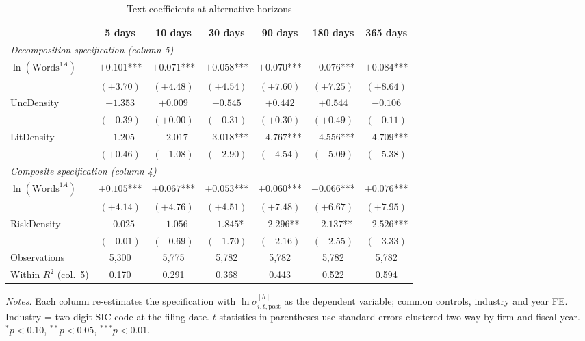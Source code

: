 \begin{table}[htbp]
\centering
\caption{Text coefficients at alternative horizons}
\label{tab:horizons}
\small
\begin{tabular}{lcccccc}
\toprule
 & 5 days & 10 days & 30 days & 90 days & 180 days & 365 days \\
\midrule
\multicolumn{7}{l}{\emph{Decomposition specification (column 5)}} \\
$\ln(\text{Words}^{1A})$ & $+0.101$*** & $+0.071$*** & $+0.058$*** & $+0.070$*** & $+0.076$*** & $+0.084$*** \\
 & $(+3.70)$ & $(+4.48)$ & $(+4.54)$ & $(+7.60)$ & $(+7.25)$ & $(+8.64)$ \\[2pt]
UncDensity & $-1.353$ & $+0.009$ & $-0.545$ & $+0.442$ & $+0.544$ & $-0.106$ \\
 & $(-0.39)$ & $(+0.00)$ & $(-0.31)$ & $(+0.30)$ & $(+0.49)$ & $(-0.11)$ \\[2pt]
LitDensity & $+1.205$ & $-2.017$ & $-3.018$*** & $-4.767$*** & $-4.556$*** & $-4.709$*** \\
 & $(+0.46)$ & $(-1.08)$ & $(-2.90)$ & $(-4.54)$ & $(-5.09)$ & $(-5.38)$ \\[2pt]
\multicolumn{7}{l}{\emph{Composite specification (column 4)}} \\
$\ln(\text{Words}^{1A})$ & $+0.105$*** & $+0.067$*** & $+0.053$*** & $+0.060$*** & $+0.066$*** & $+0.076$*** \\
 & $(+4.14)$ & $(+4.76)$ & $(+4.51)$ & $(+7.48)$ & $(+6.67)$ & $(+7.95)$ \\[2pt]
RiskDensity & $-0.025$ & $-1.056$ & $-1.845$* & $-2.296$** & $-2.137$** & $-2.526$*** \\
 & $(-0.01)$ & $(-0.69)$ & $(-1.70)$ & $(-2.16)$ & $(-2.55)$ & $(-3.33)$ \\[2pt]
\midrule
Observations & 5,300 & 5,775 & 5,782 & 5,782 & 5,782 & 5,782 \\
Within $R^2$ (col.\ 5) & 0.170 & 0.291 & 0.368 & 0.443 & 0.522 & 0.594 \\
\bottomrule
\end{tabular}
\par\smallskip
\begin{minipage}{\linewidth}\footnotesize
\emph{Notes.} Each column re-estimates the specification with $\ln\sigma^{[h]}_{i,t,\mathrm{post}}$ as the dependent variable; common controls, industry and year FE. Industry = two-digit SIC code at the filing date. $t$-statistics in parentheses use standard errors clustered two-way by firm and fiscal year. $^{*}p<0.10$, $^{**}p<0.05$, $^{***}p<0.01$.
\end{minipage}
\end{table}
